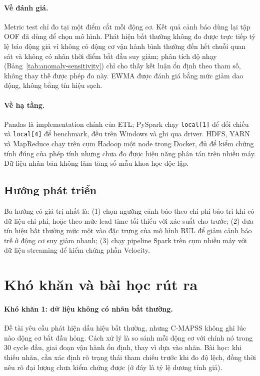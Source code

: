 \paragraph{Về đánh giá.} Metric test chỉ đo tại một điểm cắt mỗi động cơ. Kết quả
cảnh báo dùng lại tập OOF đã dùng để chọn mô hình. Phát hiện bất thường không đo được
trực tiếp tỷ lệ báo động giả vì không có động cơ vận hành bình thường đến hết chuỗi
quan sát và không có nhãn thời điểm bắt đầu suy giảm; phân tích độ nhạy
(Bảng~\ref{tab:anomaly-sensitivity}) chỉ cho thấy kết luận ổn định theo tham số,
không thay thế được phép đo này. EWMA được đánh giá bằng mức giảm dao động, không bằng tín hiệu sạch.

\paragraph{Về hạ tầng.} Pandas là implementation chính của ETL; PySpark chạy
\texttt{local[1]} để đối chiếu và \texttt{local[4]} để benchmark, đều trên Windows và
ghi qua driver. HDFS, YARN và MapReduce chạy trên cụm Hadoop một node trong Docker,
đủ để kiểm chứng tính đúng của phép tính nhưng chưa đo được hiệu năng phân tán trên
nhiều máy. Dữ liệu nhân bản không làm tăng số mẫu khoa học độc lập.

\subsection{Hướng phát triển}
\label{sec:followup}
Ba hướng có giá trị nhất là: (1) chọn ngưỡng cảnh báo theo chi phí bảo trì khi có
dữ liệu chi phí, hoặc theo mức lead time tối thiểu với xác suất cho trước; (2) đưa
tín hiệu bất thường mức một vào đặc trưng của mô hình RUL để giảm cảnh báo trễ ở động
cơ suy giảm nhanh; (3) chạy pipeline Spark trên cụm nhiều máy với dữ liệu streaming
để kiểm chứng phần Velocity.

\section{Khó khăn và bài học rút ra}
\label{sec:lessons}

\paragraph{Khó khăn 1: dữ liệu không có nhãn bất thường.} Đề tài yêu cầu phát hiện
dấu hiệu bất thường, nhưng C-MAPSS không ghi lúc nào động cơ bắt đầu hỏng. Cách xử
lý là so sánh mỗi động cơ với chính nó trong 30 cycle đầu, giai đoạn vận hành ổn
định, thay vì dựa vào nhãn. Bài học: khi thiếu nhãn, cần xác định rõ trạng thái tham
chiếu trước khi đo độ lệch, đồng thời nêu rõ đại lượng chưa kiểm chứng được (ở đây là
tỷ lệ dương tính giả).

